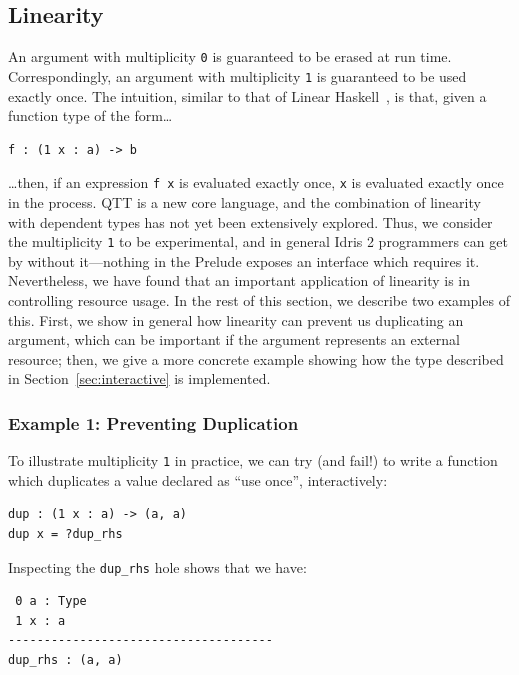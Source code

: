\subsection{Linearity}

\label{sec:linearity}

An argument with multiplicity \texttt{0} is guaranteed to be erased at run
time. Correspondingly, an argument with multiplicity \texttt{1} is guaranteed
to be used exactly once. The intuition, similar to that of Linear
Haskell~\cite{linhaskell}, is that, given a function type of the form\ldots

\begin{lstlisting}
f : (1 x : a) -> b
\end{lstlisting}

\ldots then, if an expression \texttt{f x} is evaluated exactly once, 
\texttt{x} is evaluated exactly once in the process. 
%
QTT is a new core language, and the combination of linearity with dependent
types has not yet been extensively explored. Thus, we consider
the multiplicity \texttt{1} to be experimental, and in general Idris 2
programmers can get by without it---nothing in the Prelude exposes an interface
which requires it. Nevertheless, we have found
that an important application of linearity is in controlling resource
usage.
In the rest of this section, we describe two examples of this. First, 
we show in general how linearity can prevent us duplicating an argument, which can be
important if the argument represents an external resource; then, we give a 
more concrete example showing how the  type described in
Section~\ref{sec:interactive} is implemented.

\subsubsection{Example 1: Preventing Duplication}

To illustrate multiplicity \texttt{1} in practice, we can try (and fail!) to
write a function which duplicates a value declared as ``use once'',
interactively:

\begin{lstlisting}
dup : (1 x : a) -> (a, a)
dup x = ?dup_rhs
\end{lstlisting}

Inspecting the \texttt{dup\_rhs} hole shows that we have:

\begin{lstlisting}
 0 a : Type
 1 x : a
-------------------------------------
dup_rhs : (a, a)
\end{lstlisting}


